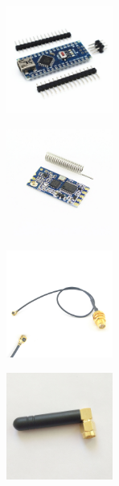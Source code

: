 \documentclass[12pt]{article}
\begin{document}
\begin{figure}[H]
\centering
\begin{minipage}{.4\textheight}
  \centering
  \includegraphics[height=3.5cm]{1.jpg}
  \label{fig:1}
\end{minipage}%
\begin{minipage}{.4\textheight}
  \centering
  \includegraphics[height=3.5cm]{2.jpg}
  \label{fig:2}
\end{minipage}
\end{figure}

\begin{figure}[H]
\centering
\begin{minipage}{.4\textheight}
  \centering
  \includegraphics[height=3.5cm]{3.jpg}
  \label{fig:3}
\end{minipage}%
\begin{minipage}{.4\textheight}
  \centering
  \includegraphics[height=3.5cm]{4.jpg}
  \label{fig:4}
\end{minipage}
\end{figure}
\end{document}
